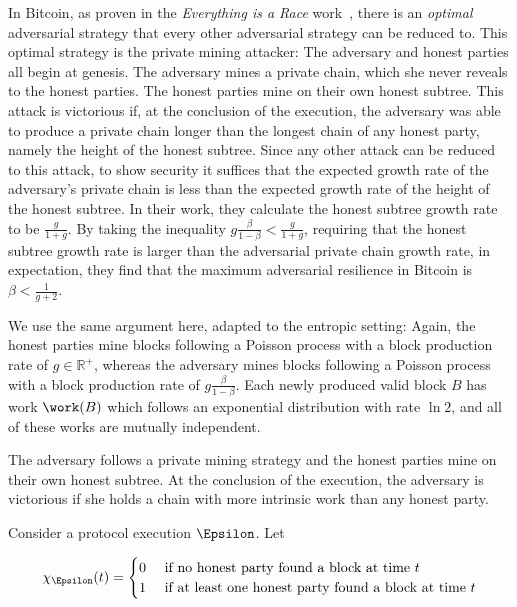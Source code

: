 In Bitcoin,
as proven in the \emph{Everything is a Race} work~\cite[Theorem 5.1]{eiar}, there is
an \emph{optimal} adversarial strategy that every other adversarial strategy can be reduced to.
This optimal strategy is the private mining attacker: The adversary and honest parties
all begin at genesis. The adversary mines a private chain, which she never reveals to the honest
parties. The honest parties mine on their own honest subtree. This attack is victorious if,
at the conclusion of the execution, the adversary was able to produce a private chain longer
than the longest chain of any honest party, namely the height of the honest subtree. Since
any other attack can be reduced to this attack, to show security it suffices that the expected
growth rate of the adversary's private chain is less than the expected growth rate of the
height of the honest subtree. In their work, they calculate the honest subtree growth rate to be
$\frac{g}{1 + g}$. By taking the inequality $g \frac{\beta}{1 - \beta} < \frac{g}{1 + g}$,
requiring that the honest subtree growth rate is larger than the adversarial private chain
growth rate, in expectation, they find that the maximum adversarial resilience in Bitcoin is
$\beta < \frac{1}{g + 2}$.

We use the same argument here, adapted to the entropic setting: Again, the honest parties mine
blocks following a Poisson process with a block production rate of $g \in \mathbb{R}^+$, whereas
the adversary mines blocks following a Poisson process with a block production rate of
$g \frac{\beta}{1 - \beta}$. Each newly produced valid block $B$ has work $\work(B)$ which follows
an exponential distribution with rate $\ln2$, and all of these works are mutually independent.


The adversary follows a private
mining strategy and the honest parties mine on their own honest subtree. At the conclusion of the
execution, the adversary is victorious if she holds a chain with more intrinsic work than any honest
party.

Consider a protocol execution $\Epsilon$. Let

\[
  \chi_\Epsilon(t) = \begin{cases}
    0 & \text{ if no honest party found a block at time } t\\
    1 & \text{ if at least one honest party found a block at time } t
  \end{cases}
\]

